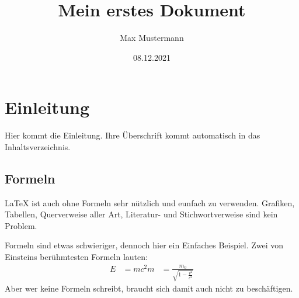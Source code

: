 \documentclass[a4paper,10pt]{scrartcl}
\title{Mein erstes Dokument}
\author{Max Mustermann}
\date{08.12.2021}
\begin{document}
\maketitle
\tableofcontents

\section{Einleitung}
Hier kommt die Einleitung. Ihre Überschrift kommt automatisch in das Inhaltsverzeichnis.

\subsection{Formeln}
\LaTeX{} ist auch ohne Formeln sehr nützlich und eunfach zu verwenden. Grafiken, Tabellen, Querverweise aller Art, Literatur- und Stichwortverweise sind kein Problem.

Formeln sind etwas schwieriger, dennoch hier ein Einfaches Beispiel. Zwei von Einsteins berühmtesten Formeln lauten:
\begin{align}
E &= mc^2
m &= \frac{m_0}{\sqrt{1-\frac{v^2}{c^2}}}
\end{align}
Aber wer keine Formeln schreibt, braucht sich damit auch nicht zu beschäftigen.
\end{document}
